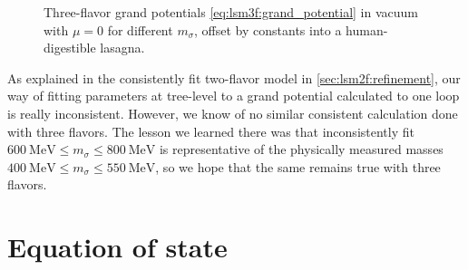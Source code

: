\begin{figure}
\caption{\label{fig:lsm3f:potential_sigma_mass}%
Three-flavor grand potentials \eqref{eq:lsm3f:grand_potential} in vacuum with $\mu=0$ for different $m_\sigma$,
offset by constants into a human-digestible lasagna.
}
\end{figure}

As explained in the consistently fit two-flavor model in \cref{sec:lsm2f:refinement},
our way of fitting parameters at tree-level to a grand potential calculated to one loop is really inconsistent.
However, we know of no similar consistent calculation done with three flavors.
The lesson we learned there was that inconsistently fit $\SI{600}{\mega\electronvolt} \leq m_\sigma \leq \SI{800}{\mega\electronvolt}$
is representative of the physically measured masses $\SI{400}{\mega\electronvolt} \leq m_\sigma \leq \SI{550}{\mega\electronvolt}$,
so we hope that the same remains true with three flavors.

\section{Equation of state}

